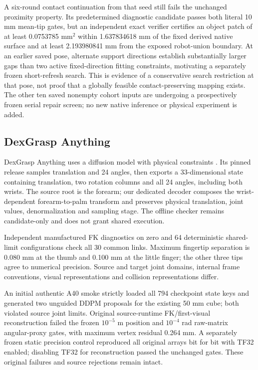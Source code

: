 \documentclass[10pt,letterpaper]{article}
\begin{document}
A six-round contact continuation from that seed still fails the unchanged
proximity property. Its predetermined diagnostic candidate passes both literal
10 mm mean-tip gates, but an independent exact verifier certifies an object
patch of at least 0.0753785 $\mathrm{mm}^2$ within 1.637834618 mm of the fixed
derived native surface and at least 2.193980841 mm from the exposed robot-union
boundary. At an earlier saved pose, alternate support directions establish
substantially larger gaps than two active fixed-direction fitting constraints,
motivating a separately frozen short-refresh search. This is evidence of a
conservative search restriction at that pose, not proof that a globally feasible
contact-preserving mapping exists. The other ten saved nonempty cohort inputs
are undergoing a prospectively frozen serial repair screen; no new native
inference or physical experiment is added.

\subsection{DexGrasp Anything}
DexGrasp Anything uses a diffusion model with physical constraints
\cite{dga}. Its pinned release samples translation and 24 angles, then exports
a 33-dimensional state containing translation, two rotation columns and all
24 angles, including both wrists. The source root is the forearm; our dedicated
decoder composes the wrist-dependent forearm-to-palm transform and preserves
physical translation, joint values, denormalization and sampling stage.
The offline checker remains candidate-only and does not grant shared execution.

Independent manufactured FK diagnostics on zero and 64 deterministic shared-limit
configurations check all 30 common links. Maximum fingertip separation is
0.080 mm at the thumb and 0.100 mm at the little finger; the other three tips
agree to numerical precision. Source and target joint domains, internal frame
conventions, visual representations and collision representations differ.

An initial authentic A40 smoke strictly loaded all 794 checkpoint state keys
and generated two unguided DDPM proposals for the existing 50 mm cube; both
violated source joint limits. Original source-runtime FK/first-visual
reconstruction failed the frozen $10^{-5}$ m position and $10^{-4}$ rad
raw-matrix angular-proxy gates, with maximum vertex residual 0.264 mm.
A separately frozen static precision control reproduced all original arrays
bit for bit with TF32 enabled; disabling TF32 for reconstruction passed the
unchanged gates. These original failures and source rejections remain intact.
\end{document}
